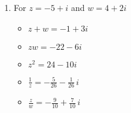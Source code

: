 \begin{enumerate}
\begin{multicols}{3}
\begin{itemize}
\item $\frac{1}{z} = \frac{3}{34} + \frac{5}{34} \,i$

\item $\frac{z}{w} = -\frac{29}{53} - \frac{31}{53} \, i$

\item $\frac{w}{z} = -\frac{29}{34} + \frac{31}{34} \,i$

\end{itemize}

\end{multicols}

\begin{multicols}{3}

\begin{itemize}

\item $\overline{z} = 3+5i$

\item $z\overline{z} = 34$

\item $(\overline{z})^2 = -16+30i$

\end{itemize}

\end{multicols}

\newpage


\item  For  $z = -5+i$ and  $w = 4+2i$

\begin{multicols}{3}

\begin{itemize}

\item $z+w = -1+3i$

\item $zw = -22-6i$

\item $z^2 = 24-10i$

\end{itemize}

\end{multicols}

\begin{multicols}{3}

\begin{itemize}

\item $\frac{1}{z} = -\frac{5}{26} - \frac{1}{26} \,i$

\item $\frac{z}{w} = -\frac{9}{10} + \frac{7}{10} \, i$


\end{itemize}
\end{multicols}
\end{enumerate}
